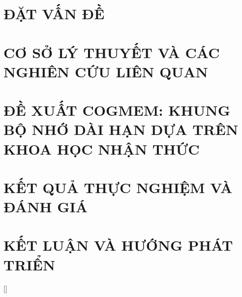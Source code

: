 \documentclass[a4paper,13pt,3p,twoside]{report}
\theoremstyle{definition}
\begin{document}
\renewcommand{\listtablename}{DANH MỤC BẢNG BIỂU}
{\let\oldnumberline\numberline
\renewcommand{\numberline}{Table~\oldnumberline}
\listoftables}

\glsaddall

\renewcommand{\figurename}{Hình}
\renewcommand{\tablename}{Bảng}
\renewcommand{\chaptername}{CHƯƠNG}



\newpage
{}

\pagestyle{fancy}
\fancyhf{}
\fancyhead[RE, LO]{\leftmark}
\fancyfoot[RE, LO]{\thepage}

\chapter{ĐẶT VẤN ĐỀ}

\newpage
\chapter{CƠ SỞ LÝ THUYẾT VÀ CÁC NGHIÊN CỨU LIÊN QUAN}



\newpage
\chapter{ĐỀ XUẤT COGMEM: KHUNG BỘ NHỚ DÀI HẠN DỰA TRÊN KHOA HỌC NHẬN THỨC}


\newpage
\chapter{KẾT QUẢ THỰC NGHIỆM VÀ ĐÁNH GIÁ}


\newpage
\chapter{KẾT LUẬN VÀ HƯỚNG PHÁT TRIỂN}


\newpage
\nocite{*}
\printbibliography
{}

\newpage
\appendix
\renewcommand{\chaptername}{PHỤ LỤC}
[]


\newpage


\newpage

\end{document}
